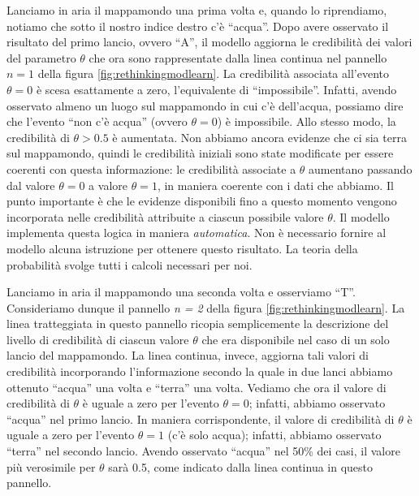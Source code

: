 \documentclass[
]{memoir}
\theoremstyle{definition}
\theoremstyle{definition}
\theoremstyle{definition}
\theoremstyle{definition}
\theoremstyle{remark}
\begin{document}
Lanciamo in aria il mappamondo una prima volta e, quando lo riprendiamo, notiamo che sotto il nostro indice destro c'è ``acqua''. Dopo avere osservato il risultato del primo lancio, ovvero ``A'', il modello aggiorna le credibilità dei valori del parametro \(\theta\) che ora sono rappresentate dalla linea continua nel pannello \(n = 1\) della figura \ref{fig:rethinkingmodlearn}. La credibilità associata all'evento \(\theta = 0\) è scesa esattamente a zero, l'equivalente di ``impossibile''. Infatti, avendo osservato almeno un luogo sul mappamondo in cui c'è dell'acqua, possiamo dire che l'evento ``non c'è acqua'' (ovvero \(\theta = 0\)) è impossibile. Allo stesso modo, la credibilità di \(\theta > 0.5\) è aumentata. Non abbiamo ancora evidenze che ci sia terra sul mappamondo, quindi le credibilità iniziali sono state modificate per essere coerenti con questa informazione: le credibilità associate a \(\theta\) aumentano passando dal valore \(\theta = 0\) a valore \(\theta = 1\), in maniera coerente con i dati che abbiamo. Il punto importante è che le evidenze disponibili fino a questo momento vengono incorporata nelle credibilità attribuite a ciascun possibile valore \(\theta\). Il modello implementa questa logica in maniera \emph{automatica}. Non è necessario fornire al modello alcuna istruzione per ottenere questo risultato. La teoria della probabilità svolge tutti i
calcoli necessari per noi.

Lanciamo in aria il mappamondo una seconda volta e osserviamo ``T''. Consideriamo dunque il pannello \emph{n = 2} della figura \ref{fig:rethinkingmodlearn}. La linea tratteggiata in questo pannello ricopia semplicemente la descrizione del livello di credibilità di ciascun valore \(\theta\) che era disponibile nel caso di un solo lancio del mappamondo. La linea continua, invece, aggiorna tali valori di credibilità incorporando l'informazione secondo la quale in due lanci abbiamo ottenuto ``acqua'' una volta e ``terra'' una volta. Vediamo che ora il valore di credibilità di \(\theta\) è uguale a zero per l'evento \(\theta = 0\); infatti, abbiamo osservato ``acqua'' nel primo lancio. In maniera corrispondente, il valore di credibilità di \(\theta\) è uguale a zero per l'evento \(\theta = 1\) (c'è solo acqua); infatti, abbiamo osservato ``terra'' nel secondo lancio. Avendo osservato ``acqua'' nel 50\% dei casi, il valore più verosimile per \(\theta\) sarà 0.5, come indicato dalla linea continua in questo pannello.
\end{document}
